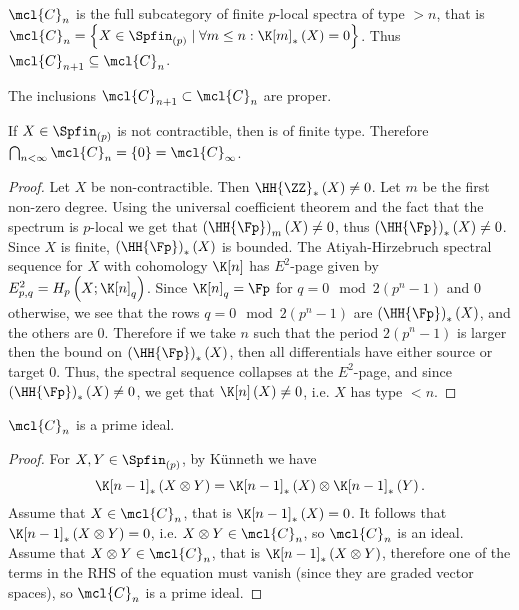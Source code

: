\begin{corollary}
	$\mcl{C}_n$ is the full subcategory of finite $p$-local spectra of type $> n$, that is $\mcl{C}_n = \left\{ X \in \Spfin_{\left(p\right)} \mid \forall m \leq n: \K[m]_*\left(X\right) = 0 \right\}$.
	Thus $\mcl{C}_{n+1} \subseteq \mcl{C}_n$.
\end{corollary}

\begin{proposition}
	The inclusions $\mcl{C}_{n+1} \subset \mcl{C}_n$ are proper.
\end{proposition}

\begin{proposition}
	If $X \in \Spfin_{\left(p\right)}$ is not contractible, then is of finite type.
	Therefore $\bigcap_{n < \infty} \mcl{C}_n = \left\{0\right\} = \mcl{C}_\infty$.
\end{proposition}

\begin{proof}
	Let $X$ be non-contractible.
	Then $\HH{\ZZ}_*\left(X\right) \neq 0$.
	Let $m$ be the first non-zero degree.
	Using the universal coefficient theorem and the fact that the spectrum is $p$-local we get that $\left(\HH{\Fp}\right)_m\left(X\right) \neq 0$, thus $\left(\HH{\Fp}\right)_*\left(X\right) \neq 0$.
	Since $X$ is finite, $\left(\HH{\Fp}\right)_*\left(X\right)$ is bounded.
	The Atiyah-Hirzebruch spectral sequence for $X$ with cohomology $\K[n]$ has $E^2$-page given by
	$
	E_{p,q}^2
	= 
	H_p\left(X; \K[n]_q\right)
	$.
	Since $\K[n]_q = \Fp$ for $q = 0 \mod 2\left(p^n-1\right)$ and $0$ otherwise,
	we see that the rows $q = 0 \mod 2\left(p^n-1\right)$ are $\left(\HH{\Fp}\right)_*\left(X\right)$, and the others are $0$.
	Therefore if we take $n$ such that the period $2\left(p^n-1\right)$ is larger then the bound on $\left(\HH{\Fp}\right)_*\left(X\right)$, then all differentials have either source or target $0$.
	Thus, the spectral sequence collapses at the $E^2$-page, and since $\left(\HH{\Fp}\right)_*\left(X\right) \neq 0$, we get that $\K[n]\left(X\right) \neq 0$, i.e. $X$ has type $<n$.
\end{proof}

\begin{proposition}
	$\mcl{C}_n$ is a prime ideal.
\end{proposition}

\begin{proof}
	For $X,Y \in \Spfin_{\left(p\right)}$, by K\"unneth we have 
	$$
	\K[n-1]_*\left(X \otimes  Y\right)
	= \K[n-1]_*\left(X\right) \otimes \K[n-1]_*\left(Y\right).
	$$
	Assume that $X \in \mcl{C}_n$, that is $\K[n-1]_*\left(X\right) = 0$.
	It follows that $\K[n-1]_*\left(X \otimes  Y\right) = 0$, i.e. $X \otimes Y \in \mcl{C}_n$, so $\mcl{C}_n$ is an ideal.
	Assume that $X \otimes Y\in \mcl{C}_n$, that is $\K[n-1]_*\left(X \otimes  Y\right)$, therefore one of the terms in the RHS of the equation must vanish (since they are graded vector spaces), so $\mcl{C}_n$ is a prime ideal.
\end{proof}


